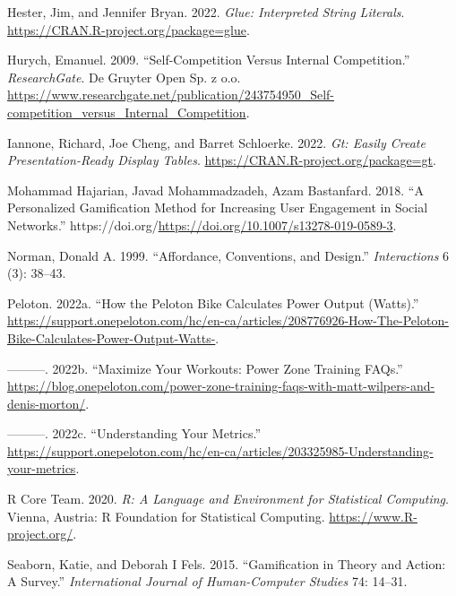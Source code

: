 \documentclass[
]{article}
\newlength{\cslhangindent}
\newlength{\cslentryspacingunit} %
\newenvironment{CSLReferences}[2] %
 {%
  \setlength{\parindent}{0pt}
  \ifodd #1
  \let\oldpar\par
  \def\par{\hangindent=\cslhangindent\oldpar}
  \fi
  \setlength{\parskip}{#2\cslentryspacingunit}
 }%
 {}
\begin{document}
\begin{CSLReferences}{1}{0}
\leavevmode{}%
Hester, Jim, and Jennifer Bryan. 2022. \emph{Glue: Interpreted String Literals}. \url{https://CRAN.R-project.org/package=glue}.

\leavevmode{}%
Hurych, Emanuel. 2009. {``Self-Competition Versus Internal Competition.''} \emph{ResearchGate}. De Gruyter Open Sp. z o.o. \url{https://www.researchgate.net/publication/243754950_Self-competition_versus_Internal_Competition}.

\leavevmode{}%
Iannone, Richard, Joe Cheng, and Barret Schloerke. 2022. \emph{Gt: Easily Create Presentation-Ready Display Tables}. \url{https://CRAN.R-project.org/package=gt}.

\leavevmode{}%
Mohammad Hajarian, Javad Mohammadzadeh, Azam Bastanfard. 2018. {``A Personalized Gamification Method for Increasing User Engagement in Social Networks.''} https://doi.org/\url{https://doi.org/10.1007/s13278-019-0589-3}.

\leavevmode{}%
Norman, Donald A. 1999. {``Affordance, Conventions, and Design.''} \emph{Interactions} 6 (3): 38--43.

\leavevmode{}%
Peloton. 2022a. {``How the Peloton Bike Calculates Power Output (Watts).''} \url{https://support.onepeloton.com/hc/en-ca/articles/208776926-How-The-Peloton-Bike-Calculates-Power-Output-Watts-}.

\leavevmode{}%
---------. 2022b. {``Maximize Your Workouts: Power Zone Training FAQs.''} \url{https://blog.onepeloton.com/power-zone-training-faqs-with-matt-wilpers-and-denis-morton/}.

\leavevmode{}%
---------. 2022c. {``Understanding Your Metrics.''} \url{https://support.onepeloton.com/hc/en-ca/articles/203325985-Understanding-your-metrics}.

\leavevmode{}%
R Core Team. 2020. \emph{R: A Language and Environment for Statistical Computing}. Vienna, Austria: R Foundation for Statistical Computing. \url{https://www.R-project.org/}.

\leavevmode{}%
Seaborn, Katie, and Deborah I Fels. 2015. {``Gamification in Theory and Action: A Survey.''} \emph{International Journal of Human-Computer Studies} 74: 14--31.


\end{CSLReferences}
\end{document}
